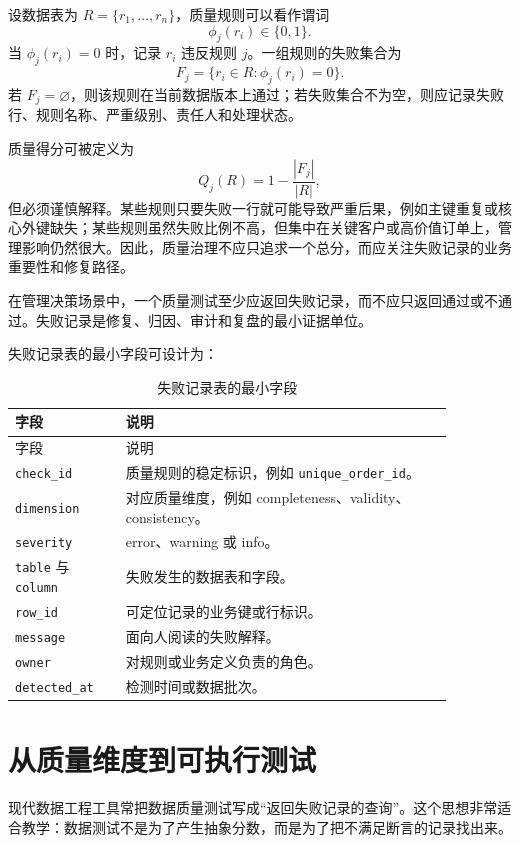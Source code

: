 \documentclass[UTF8,fontset=fandol,openany,zihao=-4]{ctexbook}
\begin{document}
设数据表为 \(R=\{r_1,\ldots,r_n\}\)，质量规则可以看作谓词
\[
\phi_j(r_i)\in\{0,1\}.
\]
当 \(\phi_j(r_i)=0\) 时，记录 \(r_i\) 违反规则 \(j\)。一组规则的失败集合为
\[
F_j=\{r_i\in R:\phi_j(r_i)=0\}.
\]
若 \(F_j=\varnothing\)，则该规则在当前数据版本上通过；若失败集合不为空，则应记录失败行、规则名称、严重级别、责任人和处理状态。

质量得分可被定义为
\[
Q_j(R)=1-\frac{|F_j|}{|R|},
\]
但必须谨慎解释。某些规则只要失败一行就可能导致严重后果，例如主键重复或核心外键缺失；某些规则虽然失败比例不高，但集中在关键客户或高价值订单上，管理影响仍然很大。因此，质量治理不应只追求一个总分，而应关注失败记录的业务重要性和修复路径。

\begin{proposition}[失败记录优先原则]
在管理决策场景中，一个质量测试至少应返回失败记录，而不应只返回通过或不通过。失败记录是修复、归因、审计和复盘的最小证据单位。
\end{proposition}

失败记录表的最小字段可设计为：
\begin{longtable}{>{\raggedright\arraybackslash}p{0.22\linewidth}>{\raggedright\arraybackslash}p{0.65\linewidth}}
\caption{失败记录表的最小字段}\\
\toprule
字段 & 说明\\
\midrule
\endfirsthead
\toprule
字段 & 说明\\
\midrule
\endhead
\texttt{check\_id} & 质量规则的稳定标识，例如 \texttt{unique\_order\_id}。\\
\texttt{dimension} & 对应质量维度，例如 completeness、validity、consistency。\\
\texttt{severity} & error、warning 或 info。\\
\texttt{table} 与 \texttt{column} & 失败发生的数据表和字段。\\
\texttt{row\_id} & 可定位记录的业务键或行标识。\\
\texttt{message} & 面向人阅读的失败解释。\\
\texttt{owner} & 对规则或业务定义负责的角色。\\
\texttt{detected\_at} & 检测时间或数据批次。\\
\bottomrule
\end{longtable}

\section{从质量维度到可执行测试}

现代数据工程工具常把数据质量测试写成“返回失败记录的查询”。这个思想非常适合教学：数据测试不是为了产生抽象分数，而是为了把不满足断言的记录找出来。
\end{document}
